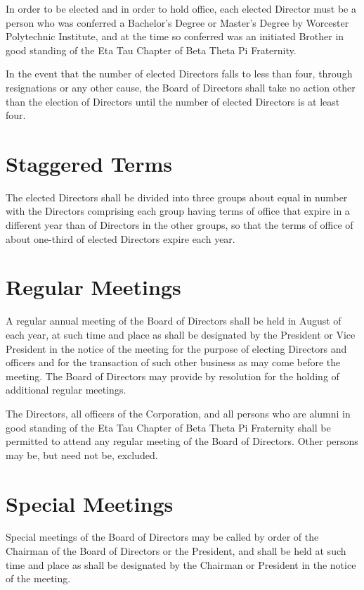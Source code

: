 In order to be elected and in order to hold office, each elected Director must
be a person who was conferred a Bachelor's Degree or Master's Degree by
Worcester Polytechnic Institute, and at the time so conferred was an initiated
Brother in good standing of the Eta Tau Chapter of Beta Theta Pi Fraternity.

In the event that the number of elected Directors falls to less than four,
through resignations or any other cause, the Board of Directors shall take no
action other than the election of Directors until the number of elected
Directors is at least four.

\section{Staggered Terms}

The elected Directors shall be divided into three groups about equal in number
with the Directors comprising each group having terms of office that expire in a
different year than of Directors in the other groups, so that the terms of
office of about one-third of elected Directors expire each year.

\section{Regular Meetings}

A regular annual meeting of the Board of Directors shall be held in August of
each year, at such time and place as shall be designated by the President or
Vice President in the notice of the meeting for the purpose of electing
Directors and officers and for the transaction of such other business as may
come before the meeting.  The Board of Directors may provide by resolution for
the holding of additional regular meetings.

The Directors, all officers of the Corporation, and all persons who are alumni
in good standing of the Eta Tau Chapter of Beta Theta Pi Fraternity shall be
permitted to attend any regular meeting of the Board of Directors.  Other
persons may be, but need not be, excluded.

\section{Special Meetings}

Special meetings of the Board of Directors may be called by order of the
Chairman of the Board of Directors or the President, and shall be held at such
time and place as shall be designated by the Chairman or President in the notice
of the meeting.

